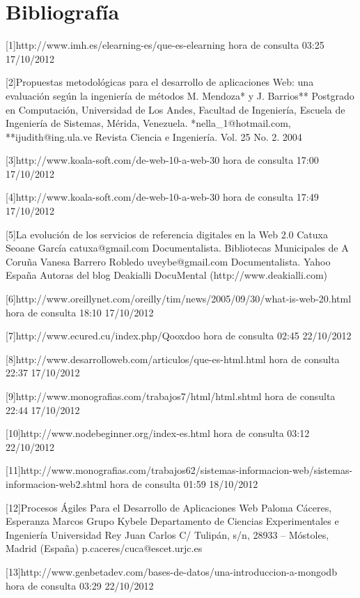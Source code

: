 \section{Bibliografía}

[1]http://www.imh.es/elearning-es/que-es-elearning hora de consulta 03:25 17/10/2012

[2]Propuestas metodológicas para el desarrollo de aplicaciones Web: una evaluación según la ingeniería de métodos
   M. Mendoza* y J. Barrios**
   Postgrado en Computación,
   Universidad de Los Andes, Facultad de Ingeniería,
   Escuela de Ingeniería de Sistemas,
   Mérida, Venezuela.
   *nella\_1@hotmail.com,
   **ijudith@ing.ula.ve
   Revista Ciencia e Ingeniería. Vol. 25 No. 2. 2004 


[3]http://www.koala-soft.com/de-web-10-a-web-30 hora de consulta 17:00 17/10/2012

[4]http://www.koala-soft.com/de-web-10-a-web-30 hora de consulta 17:49 17/10/2012

[5]La evolución de los servicios de referencia digitales en la Web 2.0
   Catuxa Seoane García
   catuxa@gmail.com
   Documentalista. Bibliotecas Municipales de A Coruña
   Vanesa Barrero Robledo
   uveybe@gmail.com
   Documentalista. Yahoo España
   Autoras del blog Deakialli DocuMental (http://www.deakialli.com)
    
[6]http://www.oreillynet.com/oreilly/tim/news/2005/09/30/what-is-web-20.html  hora de consulta 18:10 17/10/2012

[7]http://www.ecured.cu/index.php/Qooxdoo hora de consulta 02:45 22/10/2012

[8]http://www.desarrolloweb.com/articulos/que-es-html.html hora de consulta 22:37 17/10/2012

[9]http://www.monografias.com/trabajos7/html/html.shtml hora de consulta 22:44 17/10/2012

[10]http://www.nodebeginner.org/index-es.html hora de consulta 03:12 22/10/2012

[11]http://www.monografias.com/trabajos62/sistemas-informacion-web/sistemas-informacion-web2.shtml hora de consulta 01:59 18/10/2012

[12]Procesos Ágiles Para el Desarrollo de Aplicaciones Web 
    Paloma Cáceres, Esperanza Marcos
    Grupo Kybele
    Departamento de Ciencias Experimentales e Ingeniería
    Universidad Rey Juan Carlos
    C/ Tulipán, s/n, 28933 – Móstoles, Madrid (España)
    {p.caceres/cuca}@escet.urjc.es
    
[13]http://www.genbetadev.com/bases-de-datos/una-introduccion-a-mongodb hora de consulta 03:29 22/10/2012
    
